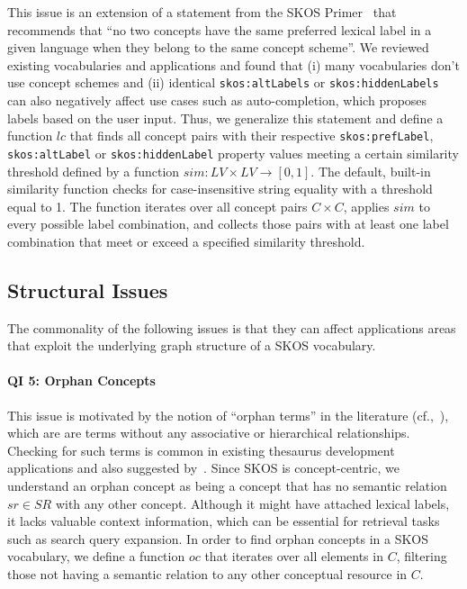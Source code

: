 This issue is an extension of a statement from the SKOS Primer~\cite{Isaac2009} that recommends that ``no two concepts have the same preferred lexical label in a given language when they belong to the same concept scheme''. We reviewed existing vocabularies and applications and found that (i) many vocabularies don't use concept schemes and (ii) identical \texttt{skos:altLabels} or \texttt{skos:hiddenLabels} can also negatively affect use cases such as auto-completion, which proposes labels based on the user input.
Thus, we generalize this statement and define a function $lc$ that finds all concept pairs with their respective \texttt{skos:prefLabel}, \texttt{skos:altLabel} or \texttt{skos:hiddenLabel} property values meeting a certain similarity threshold defined by a function $sim:LV \times LV \rightarrow [0,1]$. The default, built-in similarity function checks for case-insensitive string equality with a threshold equal to 1. The function iterates over all concept pairs $C \times C$, applies $sim$ to every possible label combination, and collects those pairs with at least one label combination that meet or exceed a specified similarity threshold.


\subsection{Structural Issues}

The commonality of the following issues is that they can affect applications areas that exploit the underlying graph structure of a SKOS vocabulary.

\paragraph{QI 5: Orphan Concepts}

This issue is motivated by the notion of ``orphan terms'' in the literature (cf.,~\cite{Hedden2010}), which are are terms without any associative or hierarchical relationships. Checking for such terms is common in existing thesaurus development applications and also suggested by~\cite{Z39.19:2005}. Since SKOS is concept-centric, we understand an orphan concept as being a concept that has no semantic relation $sr \in SR$ with any other concept. Although it might have attached lexical labels, it lacks valuable context information, which can be essential for retrieval tasks such as search query expansion.
In order to find orphan concepts in a SKOS vocabulary, we define a function $oc$ that iterates over all elements in $C$, filtering those not having a semantic relation to any other conceptual resource in $C$. 


